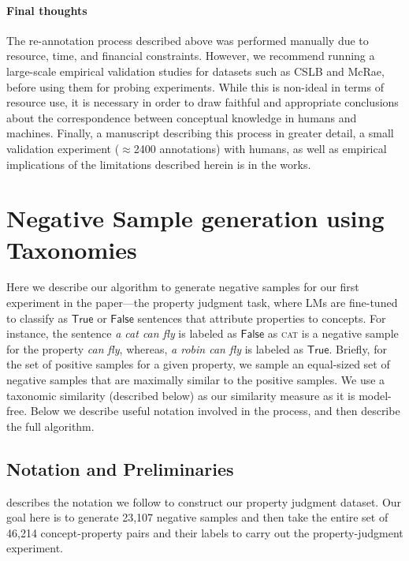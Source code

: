 \documentclass[11pt]{article}    %
\newcommand{\true}{\mathsf{True}}
\newcommand{\false}{\mathsf{False}}
\begin{document}
\paragraph{Final thoughts} The re-annotation process described above was performed manually due to resource, time, and financial constraints. However, we recommend running a large-scale empirical validation studies for datasets such as CSLB and McRae, before using them for probing experiments. 
While this is non-ideal in terms of resource use, it is necessary in order to draw faithful and appropriate conclusions about the correspondence between conceptual knowledge in humans and machines. 
Finally, a manuscript describing this process in greater detail, a small validation experiment ($\approx$2400 annotations) with humans, as well as empirical implications of the limitations described herein is in the works.

\section{Negative Sample generation using Taxonomies}
Here we describe our algorithm to generate negative samples for our first experiment in the paper---the property judgment task, where LMs are fine-tuned to classify as $\true$ or $\false$ sentences that attribute properties to concepts. For instance, the sentence \textit{a cat can fly} is labeled as $\false$ as \textsc{cat} is a negative sample for the property \textit{can fly}, whereas, \textit{a robin can fly} is labeled as $\true$.
Briefly, for the set of positive samples for a given property, we sample an equal-sized set of negative samples that are maximally similar to the positive samples. We use a taxonomic similarity (described below) as our similarity measure as it is model-free. Below we describe useful notation involved in the process, and then describe the full algorithm.
\subsection{Notation and Preliminaries}
 describes the notation we follow to construct our property judgment dataset. Our goal here is to generate 23{,}107 negative samples and then take the entire set of 46{,}214 concept-property pairs and their labels to carry out the property-judgment experiment.

\end{document}
